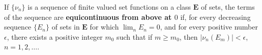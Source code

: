 If $\{\nu_n\}$ is a sequence of finite valued set functions on a class $\mathbf{E}$ of sets, the terms of the sequence are \textbf{equicontinuous from above at $0$} if, for every decreasing sequence $\{E_n\}$ of sets in $\mathbf{E}$ for which $\lim_n E_n = 0$, and for every positive number $\epsilon$, there exists a positive integer $m_0$ such that if $m \geq m_0$, then $|\nu_n(E_m)| < \epsilon$, $n = 1, 2, \dots$.
